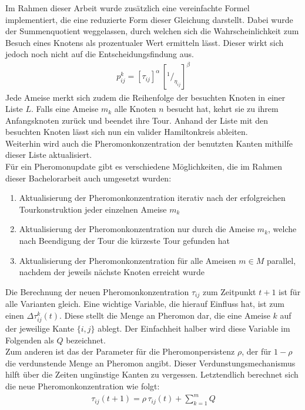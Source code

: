 \documentclass[doktyp=barbeit, sprache=german]{TUBAFarbeiten}
\newcommand*\rfrac[2]{{}^{#1}\!/_{#2}}
\begin{document}
Im Rahmen dieser Arbeit wurde zusätzlich eine vereinfachte Formel implementiert, die eine reduzierte Form dieser Gleichung darstellt. Dabei wurde der Summenquotient weggelassen, durch welchen sich die Wahrscheinlichkeit zum Besuch eines Knotens als prozentualer Wert ermitteln lässt. Dieser wirkt sich jedoch noch nicht auf die Entscheidungsfindung aus.
\begin{align}
\label{eq:ProbSimple}
p^k_{ij} = [\tau_{ij}]^\alpha \, [\rfrac{1}{\eta_{ij}}]^\beta
\end{align}
Jede Ameise merkt sich zudem die Reihenfolge der besuchten Knoten in einer Liste $L$. Falls eine Ameise $m_k$ alle Knoten $n$ besucht hat, kehrt sie zu ihrem Anfangsknoten zurück und beendet ihre Tour. Anhand der Liste mit den besuchten Knoten lässt sich nun ein valider Hamiltonkreis ableiten. 
\\Weiterhin wird auch die Pheromonkonzentration der benutzten Kanten mithilfe dieser Liste aktualisiert.
\\Für ein Pheromonupdate gibt es verschiedene Möglichkeiten, die im Rahmen dieser Bachelorarbeit auch umgesetzt wurden: 
\begin{enumerate}
\label{enum:Update}
\item Aktualisierung der Pheromonkonzentration iterativ nach der erfolgreichen Tourkonstruktion jeder einzelnen Ameise $m_k$
\item Aktualisierung der Pheromonkonzentration nur durch die Ameise $m_k$, welche nach Beendigung der Tour die kürzeste Tour gefunden hat
\item Aktualisierung der Pheromonkonzentration für alle Ameisen $m \in M$ parallel, nachdem der jeweils nächste Knoten erreicht wurde
\end{enumerate}
Die Berechnung der neuen Pheromonkonzentration $\tau_{ij}$ zum Zeitpunkt $t + 1$ ist für alle Varianten gleich. Eine wichtige Variable, die hierauf Einfluss hat, ist zum einen $\Delta \tau^k_{ij} (t)$. Diese stellt die Menge an Pheromon dar, die eine Ameise $k$ auf der jeweilige Kante $\{i,j\}$ ablegt. Der Einfachheit halber wird diese Variable im Folgenden als $Q$ bezeichnet.
\\Zum anderen ist das der Parameter für die Pheromonpersistenz $\rho$, der für $1-\rho$ die verdunstende Menge an Pheromon angibt. Dieser Verdunstungsmechanismus hilft über die Zeiten ungünstige Kanten zu \glqq vergessen\grqq. Letztendlich berechnet sich die neue Pheromonkonzentration wie folgt:
\begin{align}
\label{eq:Pheromone}
\tau_{ij}(t+1) = \rho \, \tau_{ij}(t) + \sum_{k=1}^m Q
\end{align}
\newpage
\end{document}
